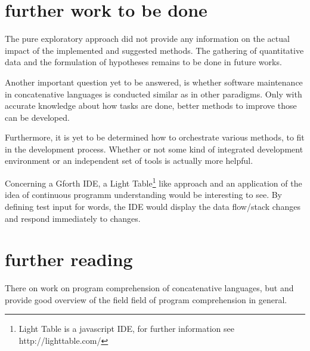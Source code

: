 \section{further work to be done}

The pure exploratory approach did not provide any information on the actual impact of the implemented and suggested methods. The gathering of quantitative data and the formulation of hypotheses remains to be done in future works.

Another important question yet to be answered, is whether software maintenance in concatenative languages is conducted similar as in other paradigms. Only with accurate knowledge about how tasks are done, better methods to improve those can be developed.

Furthermore, it is yet to be determined how to orchestrate various methods, to fit in the development process. Whether or not some kind of integrated development environment or an independent set of tools is actually more helpful.

Concerning a Gforth IDE, a Light Table\footnote{Light Table is a javascript IDE, for further information see http://lighttable.com/} like approach and an application of the idea of continuous programm understanding\cite{Muller:2000:RER:336512.336526} would be interesting to see. By defining test input for words, the IDE would display the data flow/stack changes and respond immediately to changes.



\section{further reading}

There on work on program comprehension of concatenative languages, but \cite{Canfora:2011:ACS:1924421.1924451} and \cite{Cornelissen2009} provide good overview of the field field of program comprehension in general.